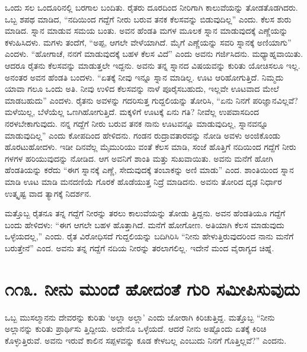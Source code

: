 ಒಂದು ಸಲ ಒಂದೂರಿನಲ್ಲಿ ಬರಗಾಲ ಬಂದಿತು. ರೈತರು ದೂರದಿಂದ ನೀರಿಗಾಗಿ ಕಾಲುವೆಯನ್ನು ತೋಡತೊಡಗಿದರು. ಒಬ್ಬ ಶಪಥ ಮಾಡಿದ, “ನದಿಯಿಂದ ಗದ್ದೆಗೆ ನೀರು ಬರುವ ತನಕ ಕೆಲಸವನ್ನು ಬಿಡುವುದಿಲ್ಲ” ಎಂದು. ಕೆಲಸ ಶುರು ಮಾಡಿದ. ಸ್ನಾನ ಮಾಡುವ ಸಮಯ ಬಂತು. ಅವನ ಹೆಂಡತಿ ಮಗಳ ಮೂಲಕ ಸ್ನಾನ ಮಾಡುವುದಕ್ಕೆ ಎಣ್ಣೆಯನ್ನು ಕಳುಹಿಸಿದಳು. ಮಗಳು ತಂದೆಗೆ, “ಅಪ್ಪ, ಆಗಲೇ ವೇಳೆಯಾಗಿದೆ. ಮೈಗೆ ಎಣ್ಣೆಯನ್ನು ಸವರಿ ಸ್ನಾನಕ್ಕೆ ಅಣಿಯಾಗು” ಎಂದಳು. “ಹೋಗಾಚೆ, ನನಗೆ ಮಾಡುವುದಕ್ಕೆ ಬಹಳ ಕೆಲಸ ವಿದೆ” ಎಂದು ಅವನು ಗರ್ಜಿಸಿದನು. ಮಧ್ಯಾಹ್ನವಾಯಿತು. ಆದರೂ ರೈತನು ಕೆಲಸವನ್ನು ಮಾಡುತ್ತಲೇ ಇದ್ದನು. ಅವನು ತನ್ನ ಸ್ನಾನದ ವಿಷಯವನ್ನು ಕುರಿತು ಯೋಚಿಸಲೂ ಇಲ್ಲ. ಅನಂತರ ಅವನ ಹೆಂಡತಿ ಬಂದಳು. “ಏತಕ್ಕೆ ನೀವು ಇನ್ನೂ ಸ್ನಾನ ಮಾಡಿಲ್ಲ. ಊಟ ಆರಿಹೋಗುತ್ತಿದೆ. ನಿಮ್ಮದು ಯಾವಾ ಗಲೂ ಒಂದು ಅತಿ. ನೀವು ಉಳಿದ ಕೆಲಸವನ್ನು ನಾಳೆ ಪೂರೈಸಬಹುದು, ಇಲ್ಲವೇ ಊಟವಾದ ಮೇಲೆ ಮಾಡಬಹುದು” ಎಂದಳು. ರೈತನು ಅವಳನ್ನು ಗದರಿಸುತ್ತ ಗುದ್ದಲಿಯನ್ನು ತೋರಿಸಿ, “ಏನು ನಿನಗೆ ಪರಿಜ್ಞಾನವಿಲ್ಲವೆ? ಮಳೆಯಿಲ್ಲ, ಬೆಳೆಯೆಲ್ಲ ಒಣಗಿಹೋಗುತ್ತಿದೆ. ಮಕ್ಕಳಿಗೆ ಊಟಕ್ಕೆ ಏನು ಗತಿ? ನೀವೆಲ್ಲ ಉಪವಾಸದಿಂದ ನರಳಬೇಕಾಗುವುದು. ನನ್ನ ಗದ್ದೆಗೆ ನೀರು ಬರುವ ತನಕ ನಾನು ಊಟವನ್ನೂ ಮಾಡುವುದಿಲ್ಲ, ಸ್ನಾನವನ್ನೂ ಮಾಡುವುದಿಲ್ಲ” ಎಂದು ಕೋಪದಿಂದ ಹೇಳಿದನು. ಗಂಡನ ರುದ್ರಾವತಾರವನ್ನು ನೋಡಿ ಅವಳು ಅಂಜಿಕೊಂಡು ಹೊರಟುಹೋದಳು. ಇಡೀ ದಿನವೆಲ್ಲ ಮೈಮುರಿಯು ವಂತೆ ಕೆಲಸ ಮಾಡಿ, ಸಂಜೆ ಹೊತ್ತಿಗೆ ನದಿಯಿಂದ ಗದ್ದೆಗೆ ನೀರು ಗಳಗಳ ಹರಿಯುವುದನ್ನು ನೋಡಿದ. ಆಗ ಅವನಿಗೆ ಶಾಂತಿ ಮತ್ತು ಸುಖವಾಯಿತು. ಅವನು ಮನೆಗೆ ಹೋಗಿ ಹೆಂಡತಿಯನ್ನು ಕರೆದು “ಈಗ ಸ್ನಾನಕ್ಕೆ ಎಣ್ಣೆ, ಸೇದುವುದಕ್ಕೆ ತಂಬಾಕನ್ನು ಅಣಿ ಮಾಡು” ಎಂದ. ಶಾಂತಿಯಿಂದ ಸ್ನಾನ ಮಾಡಿ ಊಟ ಮಾಡಿ ಮನದಣಿಯೆ ಗೊರಕೆ ಹೊಡೆಯುತ್ತ ನಿದ್ರೆ ಮಾಡಿದನು. ಅವನು ತೋರಿದ ದೃಢ ನಿರ್ಧಾರ ಉತ್ಕೃಷ್ಟ ವಾದ ತ್ಯಾಗಕ್ಕೆ ನಿದರ್ಶನ.

ಮತ್ತೊಬ್ಬ ರೈತನೂ ತನ್ನ ಗದ್ದೆಗೆ ನೀರನ್ನು ತರಲು ಕಾಲುವೆಯನ್ನು ತೋಡು ತ್ತಿದ್ದನು. ಅವನ ಹೆಂಡತಿಯೂ ಗದ್ದೆಗೆ ಬಂದು ಹೇಳಿದಳು: “ಈಗ ಆಗಲೇ ಬಹಳ ಹೊತ್ತಾಗಿದೆ. ಮನೆಗೆ ಹೋಗೋಣ. ಅತಿಯಾಗಿ ಕೆಲಸ ಮಾಡುವುದು ಒಳ್ಳೆಯದಲ್ಲ,” ಎಂದು. ರೈತ ವಿರೋಧಿಸದೆ ಗುದ್ದಲಿಯನ್ನು ಬದಿಗಿರಿಸಿ “ನೀನು ಹೇಳುತ್ತಿರುವುದರಿಂದ ನಾನು ಮನೆಗೆ ಬರುತ್ತೇನೆ” ಎಂದ. ಅವನು ತನ್ನ ಗದ್ದೆಗೆ ನದಿಯ ನೀರನ್ನು ತರಲಾಗಲಿಲ್ಲ. ಇದೇನೆ ಮಂದ ವೈರಾಗ್ಯದ ಚಿಹ್ನೆ.


\section{\num{೧೧೩. } ನೀನು ಮುಂದೆ ಹೋದಂತೆ ಗುರಿ ಸಮೀಪಿಸುವುದು}

ಒಬ್ಬ ಮುಸಲ್ಮಾನನು ದೇವರನ್ನು ಕುರಿತು ‘ಅಲ್ಲಾ ಅಲ್ಲಾ’ ಎಂದು ಜೋರಾಗಿ ಕಿರಿಚುತ್ತಿದ್ದ. ಮತ್ತೊಬ್ಬ “ನೀನು ಅಲ್ಲಾನನ್ನು ಕುರಿತು ಪ್ರಾರ್ಥಿಸು ತ್ತಿದ್ದೀಯ. ಅದೇನೊ ಒಳ್ಳೆಯದೆ. ಆದರೆ ನೀನು ಅಷ್ಟೊಂದು ಏತಕ್ಕೆ ಕಿರಿಚಿ ಕೊಳ್ಳುತ್ತಿರುವೆ. ಅವನು ಇರುವೆ ಕಾಲಿನ ಸಪ್ಪಳವನ್ನು ಕೂಡ ಕೇಳಬಲ್ಲ ಎಂಬುದು ನಿನಗೆ ಗೊತ್ತಿಲ್ಲವೆ?” ಎಂದನು.


